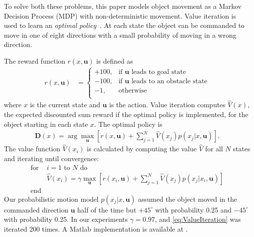 To solve both these problems, this paper models object movement as a Markov Decision Process (MDP) with non-deterministic movement.  
  Value iteration is used to learn an \emph{optimal policy}~\cite{Thrun2005}.
   At each state the object can be commanded to move in one of eight directions with a small probability of moving in a wrong direction. 
 
The reward function $r(x,\mathbf{u})$ is defined as
\begin{align}
r(x,\mathbf{u}) &=  \left\{
\begin{array}{ll}
     +100, &  \textrm{if } \mathbf{u} \textrm{ leads to goal state}\\
      -100, & \textrm{if } \mathbf{u} \textrm{ leads to an obstacle state} \\
      -1, & \textrm{otherwise}\\
\end{array} 
\right.
\end{align}
 where $x$ is the current state and $\mathbf{u}$ is the action.   %
  Value iteration computes $\hat{V}(x)$, the expected discounted sum reward if the optimal policy is implemented, for the object starting in each state $x$. The optimal policy is %
   \begin{align} \mathbf{D}(x) = \arg\max_{\mathbf{u}}  \left[ r(x,\mathbf{u}) + \sum\limits_{j=1}^N \hat{V}(x_j) p(x_j | x, \mathbf{u}) \right].  \label{eq:OptimalPolicy}
   \end{align}
   The value function $\hat{V}(x_i) $ is calculated by computing the value $\hat{V}$ for all $N$ states and iterating until convergence:
\begin{align}
\text{for }&\text{$i=1$ to $N$ do} \nonumber \\
&\hat{V} (x_i) = \gamma \max_{\mathbf{u}} \left[r(x_i,\mathbf{u}) + \sum\limits_{j=1}^N \hat{V}(x_j) p(x_j | x_i,\mathbf{u})\right] \label{eq:ValueIteration} \nonumber\\
\text{end}&  %
\end{align}
Our probabilistic motion model $p(x_j | x, \mathbf{u})$ assumed the object moved in the commanded direction $\mathbf{u}$ half of the time but $+45^\circ$ with probability 0.25 and $-45^\circ$ with probability 0.25. 
In our experiments $\gamma = 0.97$, and \eqref{eq:ValueIteration} was iterated 200 times. A {\sc Matlab} implementation is available at \cite{Becker2015MDP}.

